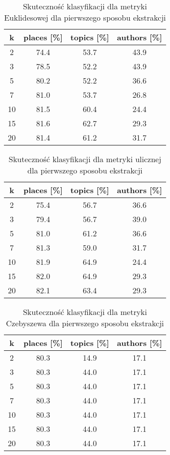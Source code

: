 \documentclass{classrep}
\begin{document}
\begin{table}[H]
	\centering
	\begin{tabular}{c c c c} 
		\hline
		\textbf{k} & \textbf{places [\%]} & \textbf{topics [\%]} &  \textbf{authors [\%]} \\ [0.5ex] 
		\hline
		\hline 
		2 & 74.4 & 53.7 & 43.9 \\ 
		3 & 78.5 & 52.2 & 43.9 \\
		5 & 80.2 & 52.2 & 36.6 \\
		7 & 81.0 & 53.7 & 26.8 \\
		10 & 81.5 & 60.4 & 24.4 \\
		15 & 81.6 & 62.7 & 29.3 \\
		20 & 81.4 & 61.2 & 31.7 \\ 
		\hline
	\end{tabular}
	\caption{Skuteczność klasyfikacji dla metryki Euklidesowej dla pierwszego sposobu ekstrakcji}
\end{table}

\begin{table}[H]
	\centering
	\begin{tabular}{c c c c} 
		\hline
		\textbf{k} & \textbf{places [\%]} & \textbf{topics [\%]} &  \textbf{authors [\%]} \\ [0.5ex] 
		\hline
		\hline 
		2 & 75.4 & 56.7 & 36.6 \\ 
		3 & 79.4 & 56.7 & 39.0 \\
		5 & 81.0 & 61.2 & 36.6 \\
		7 & 81.3 & 59.0 & 31.7 \\
		10 & 81.9 & 64.9 & 24.4 \\
		15 & 82.0 & 64.9 & 29.3 \\
		20 & 82.1 & 63.4 & 29.3 \\ 
		\hline
	\end{tabular}
	\caption{Skuteczność klasyfikacji dla metryki ulicznej dla pierwszego sposobu ekstrakcji}
\end{table}

\begin{table}[H]
	\centering
	\begin{tabular}{c c c c} 
		\hline
		\textbf{k} & \textbf{places [\%]} & \textbf{topics [\%]} &  \textbf{authors [\%]} \\ [0.5ex] 
		\hline
		\hline 
		2 & 80.3 & 14.9 & 17.1 \\ 
		3 & 80.3 & 44.0 & 17.1 \\
		5 & 80.3 & 44.0 & 17.1 \\
		7 & 80.3 & 44.0 & 17.1 \\
		10 & 80.3 & 44.0 & 17.1 \\
		15 & 80.3 & 44.0 & 17.1 \\
		20 & 80.3 & 44.0 & 17.1 \\ 
		\hline
	\end{tabular}
	\caption{Skuteczność klasyfikacji dla metryki Czebyszewa dla pierwszego sposobu ekstrakcji}
\end{table}
\end{document}
